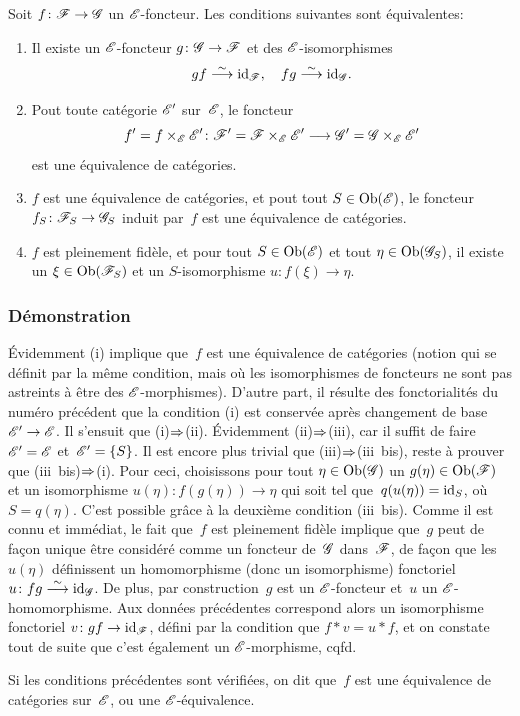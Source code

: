 \begin{proposition}
\label{VI.4.2} Soit $f \colon \cal{F} \to \cal{G}$ un
$\cal{E}$-foncteur. Les conditions suivantes sont \'equivalentes:
\begin{enumerate}
\item[(i)] Il existe un $\cal{E}$-foncteur $g \colon \cal{G} \to
\cal{F}$ et des $\cal{E}$-isomorphismes
$$
gf \isomto \id_{\cal{F}}, \quad fg \isomto \id_{\cal{G}}
.
$$
\item[(ii)] Pout toute cat\'egorie $\cal{E}'$ sur~$\cal{E}$, le
foncteur
$$
f' = f \times_{\cal{E}} \cal{E}' \colon \cal{F}' = \cal{F}
\times_{\cal{E}} \cal{E}' \to \cal{G}'=\cal{G} \times_{\cal{E}}
\cal{E}'
$$
est une \'equivalence de cat\'egories.
\item[(iii)]
$f$ est une \'equivalence de cat\'egories, et pout tout $S \in
\Ob(\cal{E})$, le foncteur $f_S \colon \cal{F}_S \to \cal{G}_S$ induit
par~$f$ est une \'equivalence de cat\'egories.
\item[(iii~bis)] $f$ est pleinement fid\`ele, et pour tout $S \in
\Ob(\cal{E})$ et tout
$\eta\in\Ob(\cal{G}_S)$,
il existe un $\xi \in \Ob(\cal{F}_S)$ et un $S$-isomorphisme
$u \colon f(\xi) \to \eta$.
\end{enumerate}
\end{proposition}

\subsubsection*{D\'emonstration} \'Evidemment (i) implique que~$f$ est une
\'equivalence de cat\'egories (notion qui se d\'efinit par la
m\^eme condition, mais o\`u les isomorphismes de foncteurs ne sont
pas astreints \`a \^etre des $\cal{E}$-morphismes). D'autre part,
il r\'esulte des fonctorialit\'es du num\'ero pr\'ec\'edent
que la condition (i) est conserv\'ee apr\`es changement de
base~$\cal{E}'\to\cal{E}$. Il s'ensuit que (i)$\To$(ii).
\'Evidemment (ii)$\To$(iii), car il suffit de faire $\cal{E}'
= \cal{E}$ et~$\cal{E}'=\{S\}$. Il est encore plus trivial que
(iii)$\To$(iii~bis), reste \`a prouver que (iii~bis)$\To$(i). Pour ceci, choisissons pour tout $\eta \in
\Ob(\cal{G})$ un $g(\eta) \in \Ob(\cal{F})$ et un isomorphisme
$u(\eta)\colon f(g(\eta))\to\eta$ qui soit tel que~$q(u(\eta)) =
\mathrm{id}_S$, o\`u~$S=q(\eta)$. C'est possible gr\^ace \`a la
deuxi\`eme condition (iii~bis). Comme il est connu et imm\'ediat,
le fait que~$f$ est pleinement fid\`ele implique que~$g$ peut de
fa\c con unique \^etre consid\'er\'e comme un foncteur
de~$\cal{G}$ dans~$\cal{F}$, de fa\c con que les~$u(\eta)$
d\'efinissent un homomorphisme (donc un isomorphisme) fonctoriel
$u\colon fg \isomto \id_{\cal{G}}$. De plus, par construction~$g$ est
un $\cal{E}$-foncteur et~$u$ un $\cal{E}$-homomorphisme. Aux
donn\'ees pr\'ec\'edentes correspond alors un isomorphisme
fonctoriel $v\colon gf \to \id_{\cal{F}}$, d\'efini par la condition
que $f*v=u*f$, et on constate tout de suite que c'est \'egalement un
$\cal{E}$-morphisme, cqfd.
\begin{definition}
\label{VI.4.3} Si les conditions pr\'ec\'edentes sont
v\'erifi\'ees, on dit que~$f$ est une \'equivalence de
cat\'egories sur~$\cal{E}$, ou une $\cal{E}$-\'equivalence.
\end{definition}

